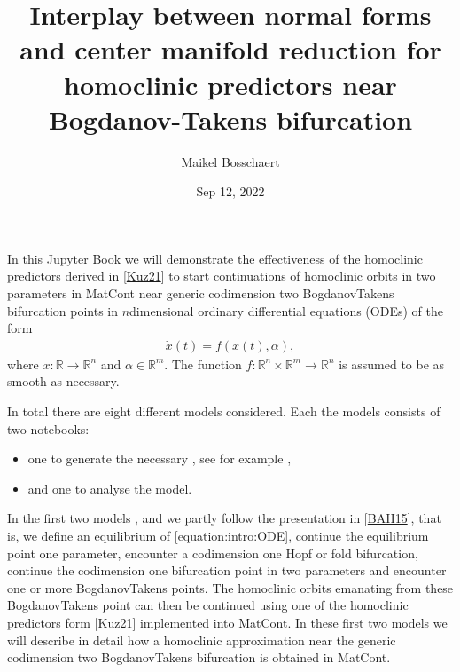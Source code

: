 \documentclass[letterpaper,10pt,english]{jupyterBook}
\title{Interplay between normal forms and center manifold reduction for homoclinic predictors near Bogdanov-Takens bifurcation}
\date{Sep 12, 2022}
\author{Maikel Bosschaert}
\begin{document}
\pagestyle{empty}
\sphinxmaketitle
\pagestyle{plain}
\sphinxtableofcontents
\pagestyle{normal}
\label{\detokenize{intro::doc}}


\sphinxAtStartPar
In this Jupyter Book we will demonstrate the effectiveness of the homoclinic
predictors derived in {[}\hyperlink{cite.references:id3}{Kuz21}{]} to start continuations of
homoclinic orbits in two parameters in MatCont near generic codimension two
Bogdanov\sphinxhyphen{}Takens bifurcation points in \(n\)\sphinxhyphen{}dimensional ordinary differential
equations (ODEs) of the form
\begin{equation}\label{equation:intro:ODE}
\begin{split}\dot x(t) = f(x(t), \alpha),\end{split}
\end{equation}
\sphinxAtStartPar
where \(x: \mathbb R \to \mathbb R^n\) and \(\alpha \in \mathbb R^m\). The
function \(f : \mathbb R^n \times \mathbb R^m \to \mathbb R^n\) is assumed to
be as smooth as necessary.

\sphinxAtStartPar
In total there are eight different models considered. Each the models consists
of two notebooks:
\begin{itemize}
\item {} 
\sphinxAtStartPar
one to generate the necessary , see for example
{\hyperref[\detokenize{Morris-LecarGenSym::doc}]{}},

\item {} 
\sphinxAtStartPar
and one  to analyse the model.

\end{itemize}

\sphinxAtStartPar
In the first two models {\hyperref[\detokenize{Morris-Lecar::doc}]{}},  and {\hyperref[\detokenize{CO-oxidation::doc}]{}}
we partly follow the presentation in {[}\hyperlink{cite.references:id5}{BAH15}{]}, that is, we define an
equilibrium of \eqref{equation:intro:ODE}, continue the equilibrium point one parameter, encounter
a codimension one Hopf or fold bifurcation, continue the codimension one
bifurcation point in two parameters and encounter one or more Bogdanov\sphinxhyphen{}Takens
points. The homoclinic orbits emanating from these Bogdanov\sphinxhyphen{}Takens point can
then be continued using one of the homoclinic predictors form
{[}\hyperlink{cite.references:id3}{Kuz21}{]} implemented into MatCont. In these first two models we
will describe in detail how a homoclinic approximation near the generic
codimension two Bogdanov\sphinxhyphen{}Takens bifurcation is obtained in MatCont.
\end{document}
